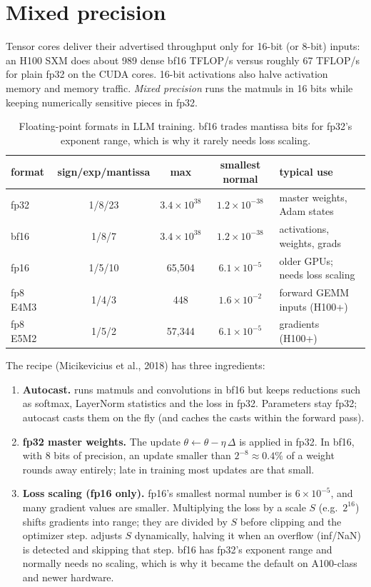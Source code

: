 \section{Mixed precision}\label{sec:pretrain:mixed}

Tensor cores deliver their advertised throughput only for 16-bit (or 8-bit) inputs: an H100
SXM does about 989 dense bf16 TFLOP/s versus roughly 67 TFLOP/s for plain fp32 on the CUDA
cores. 16-bit activations also halve activation memory and memory traffic. \emph{Mixed
precision} runs the matmuls in 16 bits while keeping numerically sensitive pieces in fp32.

\begin{table}[t]
\centering\small
\begin{tabular}{lcccl}
\toprule
format & sign/exp/mantissa & max & smallest normal & typical use \\
\midrule
fp32 & 1/8/23 & $3.4\times10^{38}$ & $1.2\times10^{-38}$ & master weights, Adam states \\
bf16 & 1/8/7 & $3.4\times10^{38}$ & $1.2\times10^{-38}$ & activations, weights, grads \\
fp16 & 1/5/10 & 65{,}504 & $6.1\times10^{-5}$ & older GPUs; needs loss scaling \\
fp8 E4M3 & 1/4/3 & 448 & $1.6\times10^{-2}$ & forward GEMM inputs (H100+) \\
fp8 E5M2 & 1/5/2 & 57{,}344 & $6.1\times10^{-5}$ & gradients (H100+) \\
\bottomrule
\end{tabular}
\caption{Floating-point formats in LLM training. bf16 trades mantissa bits for fp32's exponent
range, which is why it rarely needs loss scaling.}
\label{tab:pretrain:formats}
\end{table}

The recipe (Micikevicius et al., 2018) has three ingredients:
\begin{enumerate}
\item \textbf{Autocast.}  runs matmuls and
  convolutions in bf16 but keeps reductions such as softmax, LayerNorm statistics and the
  loss in fp32. Parameters stay fp32; autocast casts them on the fly (and caches the casts
  within the forward pass).
\item \textbf{fp32 master weights.} The update $\theta\leftarrow\theta-\eta\,\Delta$ is applied
  in fp32. In bf16, with 8 bits of precision, an update smaller than $2^{-8}\approx0.4\%$ of a
  weight rounds away entirely; late in training most updates are that small.
\item \textbf{Loss scaling (fp16 only).} fp16's smallest normal number is $6\times10^{-5}$, and
  many gradient values are smaller. Multiplying the loss by a scale $S$ (e.g.\ $2^{16}$) shifts
  gradients into range; they are divided by $S$ before clipping and the optimizer step.
   adjusts $S$ dynamically, halving it when an overflow (inf/NaN)
  is detected and skipping that step. bf16 has fp32's exponent range and normally needs no
  scaling, which is why it became the default on A100-class and newer hardware.
\end{enumerate}

